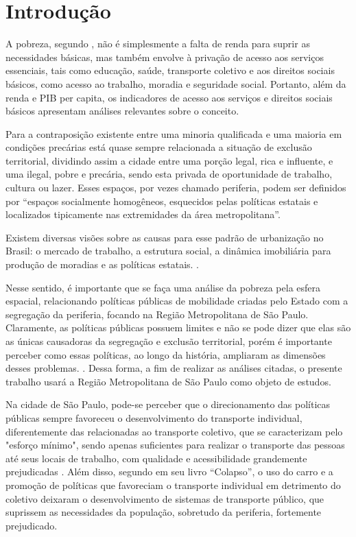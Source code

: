 \section{Introdução}
A pobreza, segundo \citeauthor{gomide2003transporte} \citeyear{gomide2003transporte}, não é simplesmente a falta de renda para suprir as necessidades básicas, mas também envolve à privação de acesso aos serviços essenciais, tais como educação, saúde, transporte coletivo e aos direitos sociais básicos, como acesso ao trabalho, moradia e seguridade social. Portanto, além da renda e PIB per capita, os indicadores de acesso aos serviços e direitos sociais básicos apresentam análises relevantes sobre o conceito.
    
Para \cite{rolnik2002possivel}  a contraposição existente entre uma minoria qualificada e uma maioria em condições precárias está quase sempre relacionada a situação de exclusão territorial, dividindo assim a cidade entre uma porção legal, rica e influente, e uma ilegal, pobre e precária, sendo esta privada de oportunidade de trabalho, cultura ou lazer. Esses espaços, por vezes chamado periferia, podem ser definidos por “espaços socialmente homogêneos, esquecidos pelas políticas estatais e localizados tipicamente nas extremidades da área metropolitana”. \cite{vasconcellos2016mobilidade}
    
Existem diversas visões sobre as causas para esse padrão de urbanização no Brasil: o mercado de trabalho, a estrutura social, a dinâmica imobiliária para produção de moradias e as políticas estatais.  \cite{vasconcellos2016mobilidade}.

Nesse sentido, é importante que se faça uma análise da pobreza pela esfera espacial, relacionando políticas públicas de mobilidade criadas pelo Estado com a segregação da periferia, focando na Região Metropolitana de São Paulo. Claramente, as políticas públicas possuem limites e não se pode dizer que elas são as únicas causadoras da segregação e exclusão territorial, porém é importante perceber como essas políticas, ao longo da história, ampliaram as dimensões desses problemas. \cite{rolnik2002possivel}. Dessa forma, a fim de realizar as análises citadas, o presente trabalho usará a Região Metropolitana de São Paulo como objeto de estudos.
	
Na cidade de São Paulo, pode-se perceber que o direcionamento das políticas públicas sempre favoreceu o desenvolvimento do transporte individual, diferentemente das relacionadas ao transporte coletivo, que se caracterizam pelo "esforço mínimo", sendo apenas suficientes para realizar o transporte das pessoas até seus locais de trabalho, com qualidade e acessibilidade grandemente prejudicadas \cite{vasconcellos2016mobilidade}. Além disso, segundo \citeauthor{diamond2005colapso} \citeyear{diamond2005colapso} em seu livro “Colapso”, o uso do carro e a promoção de políticas que favoreciam o transporte individual em detrimento do coletivo deixaram o desenvolvimento de sistemas de transporte público, que suprissem as necessidades da população, sobretudo da periferia, fortemente prejudicado.
	
